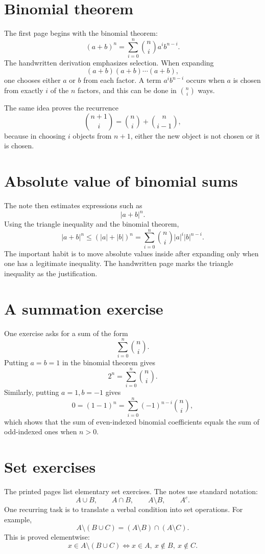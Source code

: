 
\section{Binomial theorem}

The first page begins with the binomial theorem:
\[
  (a+b)^n=\sum_{i=0}^n \binom ni a^i b^{n-i}.
\]
The handwritten derivation emphasizes selection.  When expanding
\[
  (a+b)(a+b)\cdots(a+b),
\]
one chooses either $a$ or $b$ from each factor.  A term $a^ib^{n-i}$ occurs when $a$ is chosen from exactly $i$ of the $n$ factors, and this can be done in $\binom ni$ ways.

The same idea proves the recurrence
\[
  \binom{n+1}{i}=\binom ni+\binom n{i-1},
\]
because in choosing $i$ objects from $n+1$, either the new object is not chosen or it is chosen.

\section{Absolute value of binomial sums}

The note then estimates expressions such as
\[
  |a+b|^n.
\]
Using the triangle inequality and the binomial theorem,
\[
  |a+b|^n
  \le (|a|+|b|)^n
  =\sum_{i=0}^n \binom ni |a|^i|b|^{n-i}.
\]
The important habit is to move absolute values inside after expanding only when one has a legitimate inequality.  The handwritten page marks the triangle inequality as the justification.

\section{A summation exercise}

One exercise asks for a sum of the form
\[
  \sum_{i=0}^n \binom ni.
\]
Putting $a=b=1$ in the binomial theorem gives
\[
  2^n=\sum_{i=0}^n \binom ni.
\]
Similarly, putting $a=1,b=-1$ gives
\[
  0=(1-1)^n=\sum_{i=0}^n (-1)^{n-i}\binom ni,
\]
which shows that the sum of even-indexed binomial coefficients equals the sum of odd-indexed ones when $n>0$.

\section{Set exercises}

The printed pages list elementary set exercises.  The notes use standard notation:
\[
  A\cup B,\qquad A\cap B,\qquad A\setminus B,\qquad A^c.
\]
One recurring task is to translate a verbal condition into set operations.  For example,
\[
  A\setminus(B\cup C)=(A\setminus B)\cap(A\setminus C).
\]
This is proved elementwise:
\[
  x\in A\setminus(B\cup C)
  \Longleftrightarrow
  x\in A,\ x\notin B,\ x\notin C.
\]

